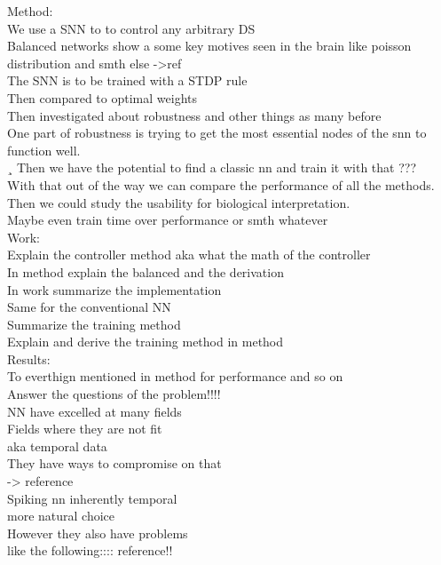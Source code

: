 Method:\\
We use a SNN to to control any arbitrary DS\\
Balanced networks show a some key motives seen in the brain like poisson distribution and smth else ->ref\\
The SNN is to be trained with a STDP rule\\
Then compared to optimal weights\\
Then investigated about robustness and other things as many before\\
One part of robustness is trying to get the most essential nodes of the snn to function well.\\¸
Then we have the potential to find a classic nn and train it with that ???\\
With that out of the way we can compare the performance of all the methods.\\
Then we could study the usability for biological interpretation.\\
Maybe even train time over performance or smth whatever\\


Work:\\
Explain the controller method aka what the math of the controller\\
In method explain the balanced and the derivation\\
In work summarize the implementation\\
Same for the conventional NN\\
Summarize the training method\\
Explain and derive the training method in method\\


Results:\\
To everthign mentioned in method for performance and so on\\
Answer the questions of the problem!!!!\\


NN have excelled at many fields\\
Fields where they are not fit\\ aka temporal data\\
They have ways to compromise on that \\ -> reference\\
Spiking nn inherently temporal \\
more natural choice\\
However they also have problems\\
like the following:::: reference!!\\
